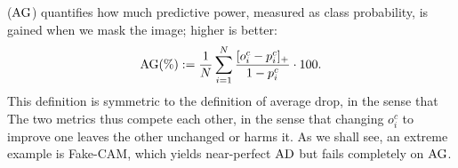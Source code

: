 {\emph{\Agf} ($\operatorname{AG}$) quantifies how much predictive power, measured as class probability, is gained when we mask the image; higher is better:
\begin{equation}
	\operatorname{AG}(\%) \mathrel{:=} \frac{1}{N} \sum_{i=1}^N \frac{[o^c_i - p^c_i]_+}{1-p^c_i} \cdot 100.
\label{eq:ag}
\end{equation}
This definition is symmetric to the definition of average drop, in the sense that  The two metrics thus compete each other, in the sense that changing $o^c_i$ to improve one leaves the other unchanged or harms it. As we shall see, an extreme example is Fake-CAM, which yields near-perfect $\operatorname{AD}$ but fails completely on $\operatorname{AG}$.
}
